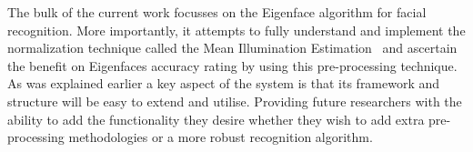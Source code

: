 	The bulk of the current work focusses on the Eigenface algorithm for facial recognition.  More importantly, 
	it attempts to fully understand and implement the normalization technique called the Mean Illumination 
	Estimation~\cite{LuoaRINMBoMEfFR} and ascertain the benefit on Eigenfaces accuracy rating by using this 
	pre-processing technique. \\
	
	As was explained earlier a key aspect of the system is that its framework and structure will be easy to extend 
	and utilise.  Providing future researchers with the ability to add the functionality they desire whether they 
	wish to add extra pre-processing methodologies or a more robust recognition algorithm.